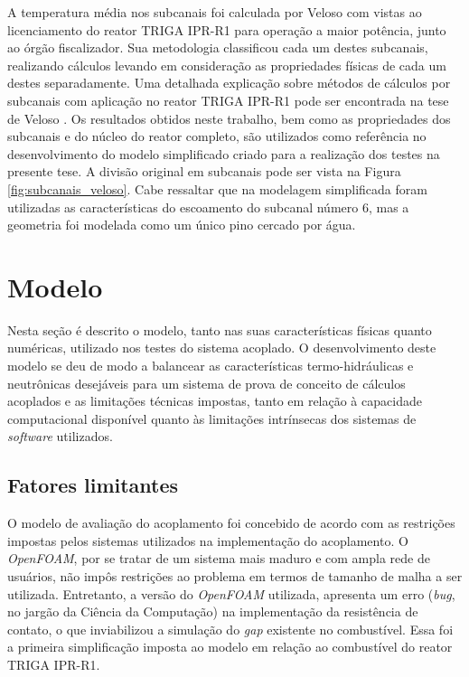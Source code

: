 A temperatura média nos subcanais foi calculada por Veloso \cite[Capítulo~8]{Veloso2005} com vistas ao licenciamento
do reator TRIGA IPR-R1 para operação a maior potência, junto ao órgão fiscalizador. Sua metodologia
classificou cada um destes subcanais, realizando cálculos levando
em consideração as propriedades físicas de cada um destes separadamente. Uma detalhada
explicação sobre métodos de cálculos por subcanais com aplicação no reator TRIGA IPR-R1
pode ser encontrada na tese de Veloso \cite{Veloso2004}. Os resultados obtidos neste
trabalho, bem como as propriedades dos subcanais e do núcleo do reator completo, são utilizados
como referência no desenvolvimento do modelo simplificado criado para a realização dos testes na
presente tese. A divisão original em subcanais pode ser vista na Figura \ref{fig:subcanais_veloso}. Cabe
ressaltar que na modelagem simplificada foram utilizadas as características do escoamento do
subcanal número $6$, mas a geometria foi modelada como um único pino cercado por água.

\section{Modelo}
%
%

Nesta seção é descrito o modelo, tanto nas suas características físicas quanto numéricas, utilizado
nos testes do sistema acoplado.
O desenvolvimento deste modelo se deu de modo a balancear as características termo-hidráulicas
e neutrônicas desejáveis para um sistema de prova de conceito de cálculos acoplados
e as limitações técnicas impostas, tanto em relação à capacidade computacional disponível quanto
às limitações intrínsecas dos sistemas de \textit{software} utilizados.

\subsection{Fatores limitantes}
\label{ssec:lim}

O modelo de avaliação do acoplamento foi concebido de acordo com as restrições impostas pelos sistemas
utilizados na implementação do acoplamento. O \textit{OpenFOAM}, por se tratar de um sistema mais maduro
e com ampla rede de usuários, não impôs
restrições ao problema em termos de tamanho de malha a ser utilizada. Entretanto, a versão
do \textit{OpenFOAM} utilizada,
apresenta um erro (\textit{bug}, no jargão da Ciência da Computação) na implementação da resistência
de contato, o que inviabilizou a simulação do \textit{gap} existente no combustível. Essa foi a
primeira simplificação imposta ao modelo em relação ao combustível do reator TRIGA IPR-R1.

